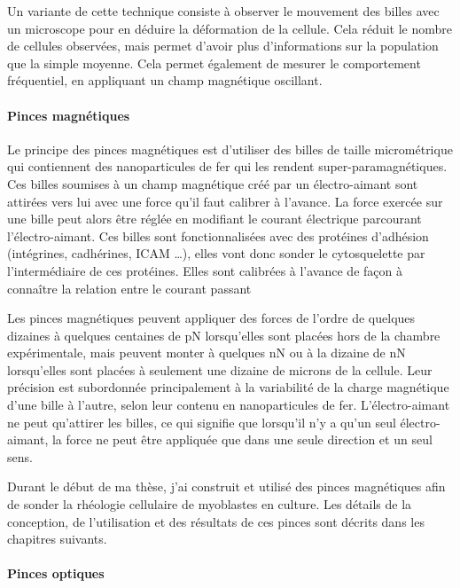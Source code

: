 Un variante de cette technique consiste à observer le mouvement des billes avec un microscope pour en déduire la déformation de la cellule. Cela réduit le nombre de cellules observées, mais permet d'avoir plus d'informations sur la population que la simple moyenne. Cela permet également de mesurer le comportement fréquentiel, en appliquant un champ magnétique oscillant. 






\paragraph{Pinces magnétiques}

Le principe des pinces magnétiques est d'utiliser des billes de taille micrométrique qui contiennent des nanoparticules de fer qui les rendent super-paramagnétiques.
Ces billes soumises à un champ magnétique créé par un électro-aimant sont attirées vers lui avec une force qu'il faut calibrer à l'avance.
La force exercée sur une bille peut alors être réglée en modifiant le courant électrique parcourant l'électro-aimant.
Ces billes sont fonctionnalisées avec des protéines d'adhésion (intégrines, cadhérines, ICAM \dots), elles vont donc sonder le cytosquelette par l'intermédiaire de ces protéines. 
Elles sont calibrées à l'avance de façon à connaître la relation entre le courant passant

Les pinces magnétiques peuvent appliquer des forces de l'ordre de quelques dizaines à quelques centaines de pN lorsqu'elles sont placées hors de la chambre expérimentale, mais peuvent monter à quelques nN ou à la dizaine de nN lorsqu'elles sont placées à seulement une dizaine de microns de la cellule. 
Leur précision est subordonnée principalement à la variabilité de la charge magnétique d'une bille à l'autre, selon leur contenu en nanoparticules de fer. 
L'électro-aimant ne peut qu'attirer les billes, ce qui signifie que lorsqu'il n'y a qu'un seul électro-aimant, la force ne peut être appliquée que dans une seule direction et un seul sens. 

Durant le début de ma thèse, j'ai construit et utilisé des pinces magnétiques afin de sonder la rhéologie cellulaire de myoblastes en culture. Les détails de la conception, de l'utilisation et des résultats de ces pinces sont décrits dans les chapitres suivants. 


\paragraph{Pinces optiques}

